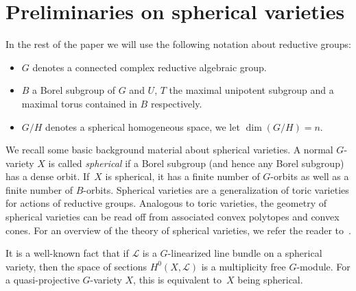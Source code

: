\documentclass[pdftex]{sigma}
\numberwithin{equation}{section}
\theoremstyle{definition}
\begin{document}
\section{Preliminaries on spherical varieties}
In the rest of the paper we will use the following notation about reductive groups:
\begin{itemize}\itemsep=0pt
\item[--] $G$ denotes a connected complex reductive algebraic group.
\item[--] $B$ a Borel subgroup of $G$ and $U$, $T$ the maximal unipotent subgroup and a maximal torus contained in $B$ respectively.
\item[--] $G/H$ denotes a spherical homogeneous space, we let $\dim(G/H) = n$.
\end{itemize}

We recall some basic background material about spherical varieties. A normal $G$-variety $X$ is called \emph{spherical} if a Borel subgroup (and hence any Borel subgroup) has a dense orbit.
If~$X$ is spherical, it has a finite number of $G$-orbits as well as a finite number of
$B$-orbits. Spherical varieties are a generalization of toric varieties for actions of reductive groups. Analogous to toric varieties, the geometry of spherical varieties
can be read off from associated convex polytopes and convex cones. For an overview of the theory of spherical varieties, we refer the reader to~\cite{Perrin}.

It is a well-known fact that if ${\mathcal L}$ is a $G$-linearized line bundle on a spherical variety, then the space of sections $H^0(X, {\mathcal L})$ is a multiplicity free $G$-module.
For a quasi-projective $G$-variety $X$, this is equivalent to~$X$ being spherical.
\end{document}
